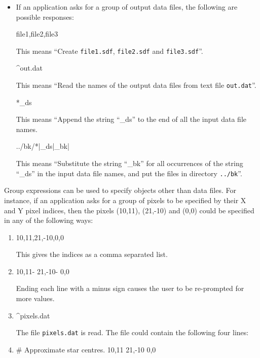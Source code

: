 \documentclass[twoside,11pt]{starlink}
\begin{document}
\begin{itemize}
\item If an application asks for a group of output data files, the following
are possible responses:

\begin{terminalv}
file1,file2,file3
\end{terminalv}
\vspace{-3mm}
This means ``Create \verb+file1.sdf+, \verb+file2.sdf+ and \verb+file3.sdf+''.

\begin{terminalv}
^out.dat
\end{terminalv}
\vspace{-3mm}
This means ``Read the names of the output data files from
text file \verb+out.dat+''.

\begin{terminalv}
*_ds
\end{terminalv}
\vspace{-3mm}
This means ``Append the string ``\_ds'' to the end of all
                      the input data file names.

\begin{terminalv}
../bk/*|_ds|_bk|
\end{terminalv}
\vspace{-3mm}
This means ``Substitute the string ``\_bk'' for all  occurrences of the string
``\_ds'' in the  input data file names, and put the files in
directory \verb+../bk+''.
\end{itemize}

Group expressions can be used to specify objects other than data files.
For instance,  if an application asks for a group of pixels to
be specified by  their X and Y pixel indices, then the pixels (10,11),
(21,-10) and (0,0) could be specified in any of the following ways:

\begin{enumerate}
\item
\begin{terminalv}
10,11,21,-10,0,0
\end{terminalv}
\vspace{3mm}
This gives the indices as a comma separated list.
\vspace{3mm}

\item
\begin{terminalv}
10,11-
21,-10-
0,0
\end{terminalv}
\vspace{3mm}
Ending each line with a minus  sign causes the user to be re-prompted for more
values.
\vspace{3mm}

\item
\begin{terminalv}
^pixels.dat
\end{terminalv}
\vspace{3mm}
The file \verb+pixels.dat+ is read. The file could contain the  following four
lines:

\item
\begin{terminalv}
#  Approximate star centres.
10,11
21,-10
0,0
\end{terminalv}
\end{enumerate}
\end{document}
